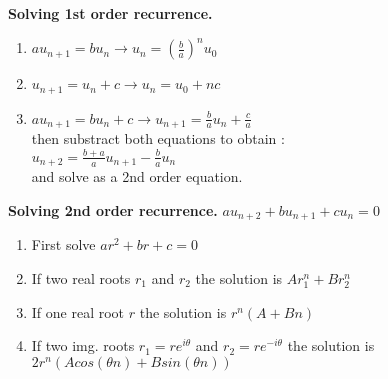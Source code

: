\textbf{Solving 1st order recurrence.}
  \begin{enumerate}
    \item $au_{n+1} = bu_n \rightarrow u_n = (\frac{b}{a})^n  u_0$
    \item $u_{n+1} = u_n + c \rightarrow u_n = u_0 + n  c$
    \item $au_{n+1} = bu_n + c \rightarrow u_{n+1} = \frac{b}{a}  u_n + \frac{c}{a}$\\
          then substract both equations to obtain :\\
          $u_{n+2} = \frac{b+a}{a}u_{n+1} - \frac{b}{a}u_n$\\
          and solve as a 2nd order equation.
  \end{enumerate}

\textbf{Solving 2nd order recurrence.} $au_{n+2} + bu_{n+1} + cu_n = 0$\\
  \begin{enumerate}
    \item First solve $ar^2 + br + c = 0$
    \item If two real roots $r_1$ and $r_2$ the solution is $Ar_1^n + Br_2^n$
    \item If one real root $r$ the solution is $r^n(A+Bn)$
    \item If two img. roots $r_1=re^{i\theta}$ and $r_2=re^{-i\theta}$ the solution is
          $2r^n(Acos(\theta n) + Bsin(\theta n))$
  \end{enumerate}
